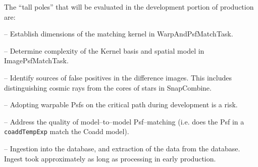 \documentclass[prd, nofootinbib, floatfix, 11pt,tightenlines,times]{article}
\begin{document}
The ``tall poles'' that will be evaluated in the development portion of production are:

-- Establish dimensions of the matching kernel in WarpAndPsfMatchTask.

-- Determine complexity of the Kernel basis and spatial model in
ImagePsfMatchTask.

-- Identify sources of false positives in the difference images.  This
includes distinguishing cosmic rays from the cores of stars in
SnapCombine.

-- Adopting  warpable Psfs on the critical path during
development is a risk.

-- Address the quality of model--to--model Psf--matching (i.e. does
the Psf in a {\tt coaddTempExp} match the Coadd model).
 
-- Ingestion into the database, and extraction of the data from the
database.  Ingest took approximately as long as processing in early
production.


\clearpage 
\end{document}
